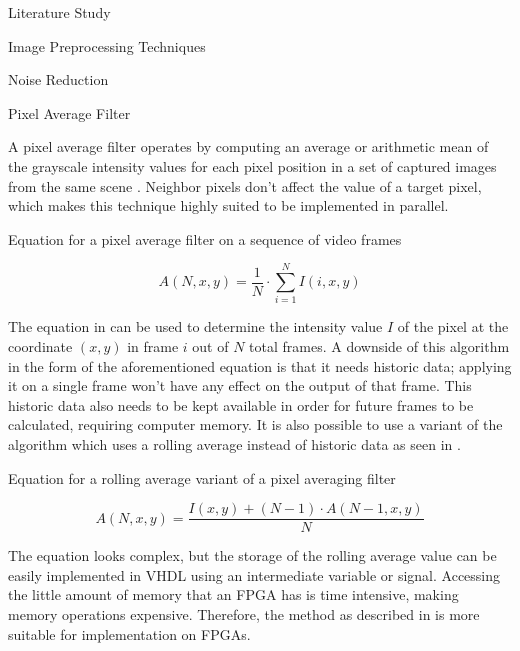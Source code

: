 \documentclass{matthijs}
\begin{document}
\begin{hoofdstuk}{Literature Study}
\begin{paragraaf}{Image Preprocessing Techniques}
\begin{subparagraaf}{Noise Reduction}
				\begin{subsubparagraaf}{Pixel Average Filter}

					A pixel average filter operates by computing an average or arithmetic mean of the grayscale intensity values for each pixel position in a set of captured images from the same scene \cite{spring2001image}.
					Neighbor pixels don't affect the value of a target pixel, which makes this technique highly suited to be implemented in parallel.
					
					\begin{figuur}{Equation for a pixel average filter on a sequence of video frames}

						\begin{equation*}
							A (N, x, y) = \frac{1}{N} \cdot \sum_{i=1}^{N} I (i, x, y)
						\end{equation*}\cite{spring2001image}
					
					\end{figuur}

					The equation in  can be used to determine the intensity value $I$ of the pixel at the coordinate $(x,y)$ in frame $i$ out of $N$ total frames.
					A downside of this algorithm in the form of the aforementioned equation is that it needs historic data; applying it on a single frame won't have any effect on the output of that frame.
					This historic data also needs to be kept available in order for future frames to be calculated, requiring computer memory.
					It is also possible to use a variant of the algorithm which uses a rolling average instead of historic data \cite{spring2001image} as seen in .

					\begin{figuur}{Equation for a rolling average variant of a pixel averaging filter}

						\begin{equation*}
							A (N, x, y) = \frac{I (x, y) + (N - 1) \cdot A (N - 1, x, y)}{N}
						\end{equation*}\cite{spring2001image}
					
					\end{figuur}

					The equation looks complex, but the storage of the rolling average value can be easily implemented in VHDL using an intermediate variable or signal.
					Accessing the little amount of memory that an FPGA has is time intensive, making memory operations expensive.
					Therefore, the method as described in  is more suitable for implementation on FPGAs.
				

\end{subsubparagraaf}
\end{subparagraaf}
\end{paragraaf}
\end{hoofdstuk}
\end{document}
